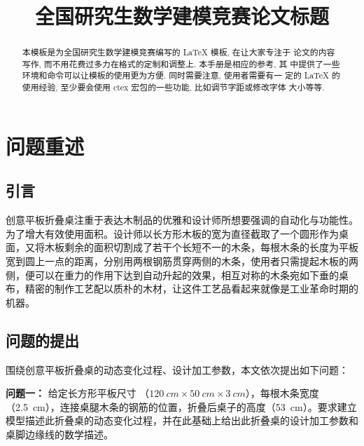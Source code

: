 \documentclass[bwprint,fontset=windows]{gmcmthesis}
\title{全国研究生数学建模竞赛论文标题}
\begin{document}
\maketitle

\begin{abstract}
本模板是为全国研究生数学建模竞赛编写的 \LaTeX{} 模板, 在让大家专注于
论文的内容写作, 而不用花费过多力在格式的定制和调整上. 本手册是相应的参考, 其
中提供了一些环境和命令可以让模板的使用更为方便. 同时需要注意, 使用者需要有一
定的 \LaTeX{} 的使用经验, 至少要会使用 ctex 宏包的一些功能, 比如调节字距或修改字体
大小等等.


\end{abstract}

\pagestyle{plain}

\maketoc

\clearpage
\section{问题重述}

\subsection{引言}   %

创意平板折叠桌注重于表达木制品的优雅和设计师所想要强调的自动化与功能性。为了增大有效使用面积。设计师以长方形木板的宽为直径截取了一个圆形作为桌面，又将木板剩余的面积切割成了若干个长短不一的木条，每根木条的长度为平板宽到圆上一点的距离，分别用两根钢筋贯穿两侧的木条，使用者只需提起木板的两侧，便可以在重力的作用下达到自动升起的效果，相互对称的木条宛如下垂的桌布，精密的制作工艺配以质朴的木材，让这件工艺品看起来就像是工业革命时期的机器。

\subsection{问题的提出}

\noindent 围绕创意平板折叠桌的动态变化过程、设计加工参数，本文依次提出如下问题：

\textbf{问题一：} 给定长方形平板尺寸 （$\SI{120}{cm} \times \SI{50}{cm} \times \SI{3}{cm}$），每根木条宽度（\SI{2.5}{cm}），连接桌腿木条的钢筋的位置，折叠后桌子的高度（\SI{53}{cm}）。要求建立模型描述此折叠桌的动态变化过程，并在此基础上给出此折叠桌的设计加工参数和桌脚边缘线的数学描述。
\end{document}
